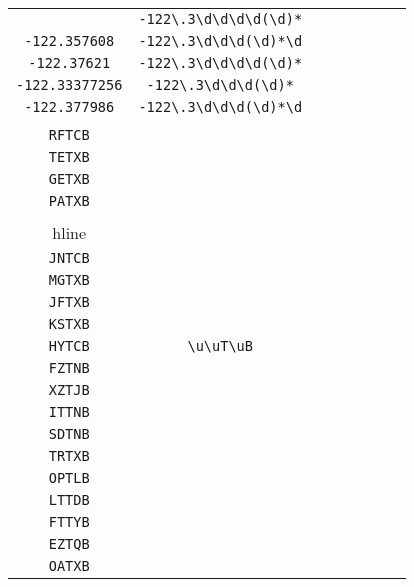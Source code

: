 \begin{longtable}{cccccccc}
\begin{tabular}{ll}
    \verb|-122.34846| & \verb|-122\.3\d\d\d\d(\d)*|\\
\verb|-122.357608| & \verb|-122\.3\d\d\d(\d)*\d|\\
\verb|-122.37621| & \verb|-122\.3\d\d\d\d(\d)*|\\
\verb|-122.33377256| & \verb|-122\.3\d\d\d(\d)*|\\
\verb|-122.377986| & \verb|-122\.3\d\d\d(\d)*\d|
\end{tabular}
\\\midrule 
\begin{tabular}{l}
    \verb|SFTCB|\\
\verb|RFTCB|\\
\verb|TETXB|\\
\verb|GETXB|\\
\verb|PATXB|\\
\\hline\\
\verb|JNTCB|\\
\verb|MGTXB|\\
\verb|JFTXB|\\
\verb|KSTXB|\\
\verb|HYTCB|
\end{tabular}

&
\verb|\u\uT\uB|
&

\begin{tabular}{l}
    \verb|\u\uT\uB|\\
\verb|FZTNB|\\
\verb|XZTJB|\\
\verb|ITTNB|\\
\verb|SDTNB|\\
\verb|TRTXB|
\end{tabular}

&

\begin{tabular}{l}
    \verb|\u\uT\uB|\\
\verb|OPTLB|\\
\verb|LTTDB|\\
\verb|FTTYB|\\
\verb|EZTQB|\\
\verb|OATXB|
\end{tabular}

&


\end{longtable}
